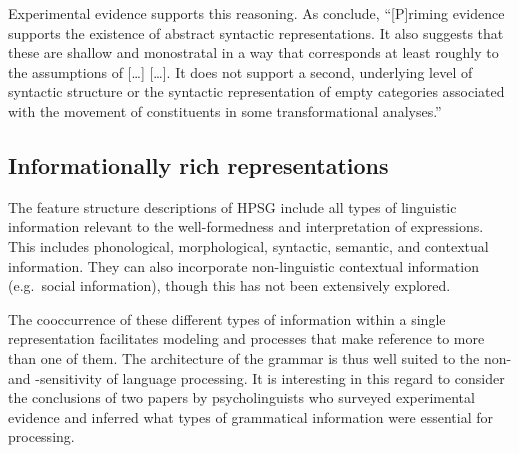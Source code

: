 \documentclass[output=paper
 	        ,biblatex
                ,babelshorthands
                ,newtxmath
                ,draftmode
                ,colorlinks, citecolor=brown
]{langscibook}
\begin{document}
Experimental evidence supports this reasoning.  As \citet[]{BraniganPickering2017} conclude,
``[P]riming evidence supports the existence of abstract syntactic representations. It also suggests
that these are shallow and monostratal in a way that corresponds at least roughly to the assumptions
of [\ldots{}] \citet{ps2} [\ldots{}]. It does not support a second, underlying level of syntactic
structure or the syntactic representation of empty categories associated with the movement of
constituents in some transformational analyses.''

\subsection{Informationally rich representations}

The feature structure descriptions of HPSG include all types of linguistic information relevant to the well-formedness and interpretation of expressions. This includes phonological, morphological, syntactic, semantic, and contextual information.  They can also incorporate non-linguistic contextual information (e.g.\ social information), though this has not been extensively explored.

The cooccurrence of these different types of information within a single
representation facilitates modeling  and  processes that make
reference to more than one of them.  The architecture of the grammar is thus well suited to the
non- and -sensitivity of language processing.  It is interesting in
this regard to consider the conclusions of two papers by psycholinguists who surveyed experimental
evidence and inferred what types of grammatical information were essential for processing.
\end{document}
